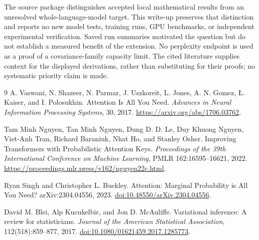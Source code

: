 \documentclass[11pt]{article}
\begin{document}
The source package distinguishes accepted local mathematical results from an unresolved whole-language-model target. This write-up preserves that distinction and reports no new model tests, training runs, GPU benchmarks, or independent experimental verification. Saved run summaries motivated the question but do not establish a measured benefit of the extension. No perplexity endpoint is used as a proof of a covariance-family capacity limit. The cited literature supplies context for the displayed derivations, rather than substituting for their proofs; no systematic priority claim is made.

\begin{thebibliography}{9}
A. Vaswani, N. Shazeer, N. Parmar, J. Uszkoreit, L. Jones, A. N. Gomez,
\L{}. Kaiser, and I. Polosukhin.
\newblock Attention Is All You Need.
\newblock \emph{Advances in Neural Information Processing Systems}, 30, 2017.
\newblock \url{https://arxiv.org/abs/1706.03762}.

Tam Minh Nguyen, Tan Minh Nguyen, Dung D. D. Le, Duy Khuong Nguyen,
Viet-Anh Tran, Richard Baraniuk, Nhat Ho, and Stanley Osher.
\newblock Improving Transformers with Probabilistic Attention Keys.
\newblock \emph{Proceedings of the 39th International Conference on Machine Learning},
PMLR 162:16595--16621, 2022.
\newblock \url{https://proceedings.mlr.press/v162/nguyen22c.html}.

Ryan Singh and Christopher L. Buckley.
\newblock Attention: Marginal Probability is All You Need?
\newblock arXiv:2304.04556, 2023.
\newblock \href{https://doi.org/10.48550/arXiv.2304.04556}{doi:10.48550/arXiv.2304.04556}.

David M. Blei, Alp Kucukelbir, and Jon D. McAuliffe.
\newblock Variational inference: A review for statisticians.
\newblock \emph{Journal of the American Statistical Association}, 112(518):859--877, 2017.
\newblock \href{https://doi.org/10.1080/01621459.2017.1285773}{doi:10.1080/01621459.2017.1285773}.
\end{thebibliography}
\end{document}
